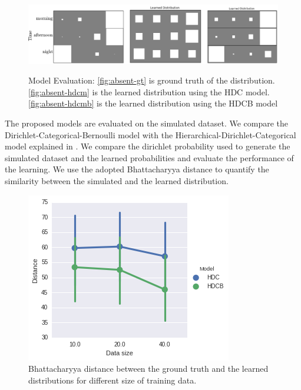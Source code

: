 \begin{figure}
    \centering
    \includegraphics[width=\textwidth]{images/absent_learned.png}
       
    \begin{minipage}[t]{.35\textwidth}
    \label{fig:absent-gt}
    \end{minipage}%
    \begin{minipage}[t]{.3\textwidth}
    \label{fig:absent-hdcm}
    \end{minipage}
    \begin{minipage}[t]{.25\textwidth}
    \label{fig:absent-hdcmb}
    \end{minipage}

\caption[Model Evaluation of HDC and HDCB ]{Model Evaluation: \ref{fig:absent-gt} is ground truth of the distribution. \ref{fig:absent-hdcm} is the learned distribution using the HDC model. \ref{fig:absent-hdcmb} is the learned distribution using the HDCB  model }
        \label{fig:absent-eval}
    
\end{figure}




The proposed models are evaluated on the simulated dataset. We compare the Dirichlet-Categorical-Bernoulli model with the Hierarchical-Dirichlet-Categorical model explained in . We compare the dirichlet probability used to generate the simulated dataset and the learned probabilities and evaluate the performance of the learning. 
We use the adopted  Bhattacharyya distance  to quantify the similarity between the simulated and the learned distribution.

\begin{figure}[htp]
\centering
\includegraphics[width=\textwidth]{images/bhatta-distance.png}
\caption[Model evaluation : Bhattacharyya distance]{Bhattacharyya distance between the ground truth and the learned distributions for different size of training data. }
\label{}
\end{figure}



